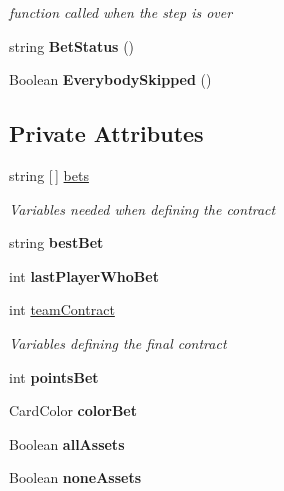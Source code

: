 \begin{DoxyCompactItemize}
\begin{DoxyCompactList}\small\item\em function called when the step is over \end{DoxyCompactList}\item 
\mbox{\label{class_coinche_1_1_auction_a735cc73557e52573a0869a34d155f301}} 
string {\bfseries Bet\+Status} ()
\item 
\mbox{\label{class_coinche_1_1_auction_aa5d49df07ba1d4548544b0c8caafe687}} 
Boolean {\bfseries Everybody\+Skipped} ()
\end{DoxyCompactItemize}
\subsection*{Private Attributes}
\begin{DoxyCompactItemize}
\item 
string \mbox{[}$\,$\mbox{]} \hyperlink{class_coinche_1_1_auction_a4f6d5c63987543272a3f34676c23970e}{bets}
\begin{DoxyCompactList}\small\item\em Variables needed when defining the contract \end{DoxyCompactList}\item 
\mbox{\label{class_coinche_1_1_auction_a929f882e7bca1c896b2fd7c7f02f93c4}} 
string {\bfseries best\+Bet}
\item 
\mbox{\label{class_coinche_1_1_auction_a9d2f45abe3188b340099fa308641b906}} 
int {\bfseries last\+Player\+Who\+Bet}
\item 
int \hyperlink{class_coinche_1_1_auction_af83095f623b0dd43fa3b3008a1743926}{team\+Contract}
\begin{DoxyCompactList}\small\item\em Variables defining the final contract \end{DoxyCompactList}\item 
\mbox{\label{class_coinche_1_1_auction_ad3b33032c91edf13209e109602372bbc}} 
int {\bfseries points\+Bet}
\item 
\mbox{\label{class_coinche_1_1_auction_a147a2d497ce78f73fcec3057ef9cc2a8}} 
Card\+Color {\bfseries color\+Bet}
\item 
\mbox{\label{class_coinche_1_1_auction_af155ec175f8fcccc9ffd106948bea164}} 
Boolean {\bfseries all\+Assets}
\item 
\mbox{\label{class_coinche_1_1_auction_a344dc87f31b624e98aa58552f8679b36}} 
Boolean {\bfseries none\+Assets}
\end{DoxyCompactItemize}
